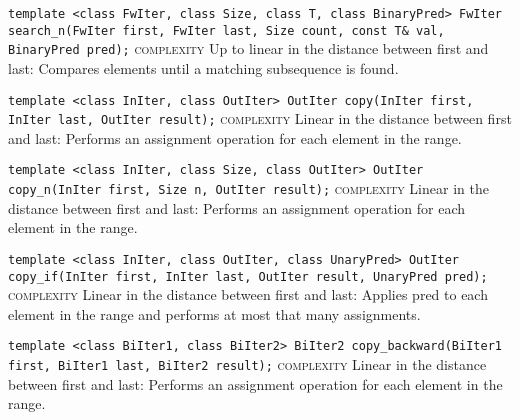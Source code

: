 \noindent{}\hspace*{0.25em}\lstinline[basicstyle=\ttfamily\color{corange}]{template <class FwIter, class Size, class T, class BinaryPred> FwIter search_n(FwIter first, FwIter last, Size count, const T& val, BinaryPred pred);} \textsc{complexity} Up to linear in the distance between first and last: Compares elements until a matching subsequence is found.\\\vspace{-0.6em}

\noindent{}\hspace*{0.25em}\lstinline[basicstyle=\ttfamily\color{corange}]{template <class InIter, class OutIter> OutIter copy(InIter first, InIter last, OutIter result);} \textsc{complexity} Linear in the distance between first and last: Performs an assignment operation for each element in the range.\\\vspace{-0.6em}

\noindent{}\hspace*{0.25em}\lstinline[basicstyle=\ttfamily\color{corange}]{template <class InIter, class Size, class OutIter> OutIter copy_n(InIter first, Size n, OutIter result);} \textsc{complexity} Linear in the distance between first and last: Performs an assignment operation for each element in the range.\\\vspace{-0.6em}

\noindent{}\hspace*{0.25em}\lstinline[basicstyle=\ttfamily\color{corange}]{template <class InIter, class OutIter, class UnaryPred> OutIter copy_if(InIter first, InIter last, OutIter result, UnaryPred pred);} \textsc{complexity} Linear in the distance between first and last: Applies pred to each element in the range and performs at most that many assignments.\\\vspace{-0.6em}

\noindent{}\hspace*{0.25em}\lstinline[basicstyle=\ttfamily\color{corange}]{template <class BiIter1, class BiIter2> BiIter2 copy_backward(BiIter1 first, BiIter1 last, BiIter2 result);} \textsc{complexity} Linear in the distance between first and last: Performs an assignment operation for each element in the range.\\\vspace{-0.6em}

